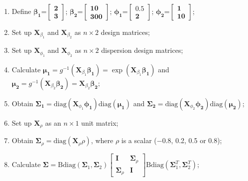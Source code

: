 \documentclass[useAMS,referee]{biom}
\begin{document}
\begin{enumerate}
\item Define	$\boldsymbol{\beta_1}$=$\begin{bmatrix}\mathbf{2}\\
\mathbf{3}
\end{bmatrix}$; $\boldsymbol{\beta_2}$=$\begin{bmatrix}\mathbf{10}\\
\mathbf{300}
\end{bmatrix}$;	
$\boldsymbol{\phi_1}$=$\begin{bmatrix}\mathbf{0.5}\\
\mathbf{2}
\end{bmatrix}$;	
$\boldsymbol{\phi_2}$=$\begin{bmatrix}\mathbf{1}\\
\mathbf{10}
\end{bmatrix}$;\\

\item Set up $\mathbf{X}_{\beta_1}$ and  $\mathbf{X}_{\beta_2}$  as  $n \times 2$ design matrices;

\item Set up  $\mathbf{X}_{\phi_1}$ and $\mathbf{X}_{\phi_2}$ as  $n \times 2$ dispersion design matrices;


\item Calculate $\boldsymbol{\mu_1} = g^{-1}(\mathbf{X}_{\beta_1}\boldsymbol{\beta_1}) = \exp(\mathbf{X}_{\beta_1}\boldsymbol{\beta_1})$ and 
$\boldsymbol{\mu_2} = g^{-1}(\mathbf{X}_{\beta_2}\boldsymbol{\beta_2}) = \mathbf{X}_{\beta_2}\boldsymbol{\beta_2}$;

\item Obtain $\boldsymbol{\Sigma_1} = \mbox{diag}(\mathbf{X}_{\phi_1} \boldsymbol{\phi_1}) \mbox{diag} (\boldsymbol{\mu_1}) $ and	
$\boldsymbol{\Sigma_2} = \mbox{diag}(\mathbf{X}_{\phi_2} \boldsymbol{\phi_2}) \mbox{diag} (\boldsymbol{\mu_2}) $;

\item Set up  $\mathbf{X}_{\rho}$ as an $n \times 1$ unit matrix; 

\item Obtain $\boldsymbol{\Sigma}_\rho=	\mbox{diag}(\mathbf{X}_\rho{\rho})$, where $\rho$ is a scalar
($-0.8$, 0.2, 0.5 or 0.8);\\

\item Calculate $	\boldsymbol{\Sigma}= \mbox{Bdiag}({\boldsymbol{\Sigma}}_1, {\boldsymbol{\Sigma}}_2)
\left[\begin{array}{cc}
\mathbf{I} & \boldsymbol{\Sigma}_\rho\\
\boldsymbol{\Sigma}_\rho & \mathbf{I} \end{array} \right]
\mbox{Bdiag}({\boldsymbol{\Sigma}}_1^{T}, \boldsymbol{{\Sigma}}_2^{T})$;\\



\end{enumerate}
\end{document}
